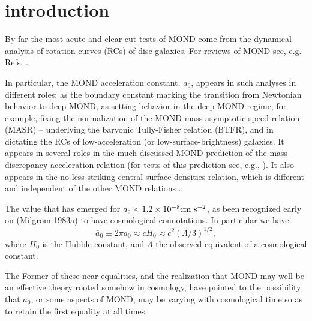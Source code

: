 \documentclass[twocolumn,showpacs,amsmath,amssymb,prd,nofootinbib]
{revtex4}
\def\sss{\scriptscriptstyle}
\def\_#1{_{\sss #1}}
\def\beq{\begin{equation}}
\def\eeqno#1{\label{#1}\end{equation}}
\def\cmss{{\rm cm~s^{-2}}}
\def\az{a\_{0}}
\begin{document}
\section{introduction}
\label{introduction}
By far the most acute and clear-cut tests of MOND \cite{milgrom83a} come from the dynamical analysis of rotation curves (RCs) of disc galaxies. For reviews of MOND see, e.g. Refs. \cite{fm12,milgrom14}.
\par
In particular, the MOND acceleration constant, $\az$, appears in such analyses in different roles: as the boundary constant marking the transition from Newtonian behavior to deep-MOND, as setting behavior in the deep MOND regime, for example, fixing the normalization of the MOND mass-asymptotic-speed relation (MASR) -- underlying the baryonic Tully-Fisher relation (BTFR), and in dictating the RCs of low-acceleration (or low-surface-brightness) galaxies. It appears in several roles in the much discussed MOND prediction \cite{milgrom83a} of the mass-discrepancy-acceleration relation (for tests of this prediction see, e.g., \cite{sanders90,mcgaugh04,tiret09,wu15,mcgaugh16a}). It also appears in the no-less-striking central-surface-densities relation, which is different and independent of the other MOND relations \cite{milgrom09a,lelli16,milgrom16a}.
\par
The value that has emerged for $\az\approx 1.2\times 10^{-8}\cmss$, as been recognized early on (Milgrom 1983a) to have cosmological connotations. In particular we have:
\beq \bar\az\equiv 2\pi \az\approx cH_0\approx c^2(\Lambda/3)^{1/2}, \eeqno{coinc}
where $H_0$ is the Hubble constant, and $\Lambda$ the observed equivalent of a cosmological constant.
\par
The Former of these near equalities, and the realization that MOND may well be an effective theory rooted somehow in cosmology, have pointed to the possibility that $\az$, or some aspects of MOND, may be varying with cosmological time  so as to retain the first equality at all times.
\end{document}
